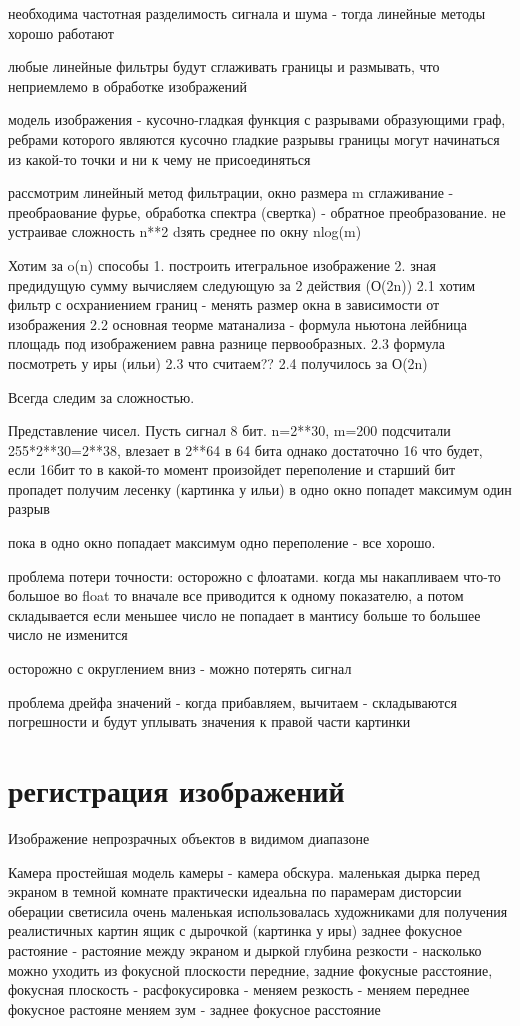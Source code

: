 \documentclass[]{report}
\begin{document}
необходима частотная разделимость сигнала и шума - тогда линейные методы хорошо работают

любые линейные фильтры будут сглаживать границы и размывать, что неприемлемо в обработке изображений

модель изображения - кусочно-гладкая функция с разрывами образующими граф, ребрами которого являются кусочно гладкие разрывы
границы могут начинаться из какой-то точки и ни к чему не присоединяться

рассмотрим линейный метод фильтрации, окно размера m
сглаживание - преобраование фурье, обработка спектра (свертка) - обратное преобразование. не устраивае сложность n**2
dзять среднее по окну nlog(m)

Хотим за o(n) 
способы
1. построить итегральное изображение
2. зная предидущую сумму вычисляем следующую за 2 действия (О(2n))
2.1 хотим фильтр с осхраниением границ - менять размер окна в зависимости от изображения
2.2 основная теорме матанализа - формула ньютона лейбница площадь под изображением равна разнице первообразных.
2.3 формула посмотреть у иры (ильи)
2.3 что считаем?? 
2.4 получилось за О(2n)

Всегда следим за сложностью.

Представление чисел.
Пусть сигнал 8 бит. n=2**30, m=200
подсчитали 255*2**30=2**38, влезает в 2**64 в 64 бита однако достаточно 16
что будет, если 16бит то в какой-то момент произойдет переполение и старший бит пропадет
получим лесенку (картинка у ильи) 
в одно окно попадет максимум один разрыв

пока в одно окно попадает максимум одно переполение - все хорошо.

проблема потери точности:
осторожно с флоатами. когда мы накапливаем что-то большое во float то вначале все приводится к одному показателю, а потом складывается
если меньшее число не попадает в мантису больше то большее число не изменится

осторожно с округлением вниз - можно потерять сигнал

проблема дрейфа значений - когда прибавляем, вычитаем - складываются погрешности и будут уплывать значения к правой части картинки

\section{регистрация изображений}
Изображение непрозрачных объектов в видимом диапазоне

Камера
простейшая модель камеры - камера обскура.
маленькая дырка перед экраном в темной комнате
практически идеальна по парамерам дисторсии оберации
светисила очень маленькая
использовалась художниками для получения реалистичных картин
ящик с дырочкой (картинка у иры)
заднее фокусное растояние - растояние между экраном и дыркой
глубина резкости - насколько можно уходить из фокусной плоскости
передние, задние фокусные расстояние, фокусная плоскость -
расфокусировка - 
меняем резкость - меняем переднее фокусное растояне
меняем зум - заднее фокусное расстояние
\end{document}
